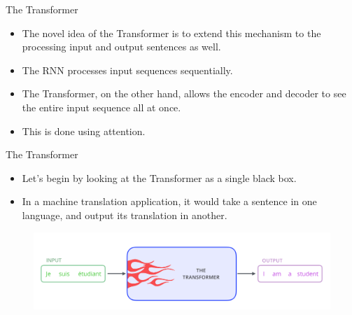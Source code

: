 \documentclass[handout]{beamer}
\begin{document}
\begin{frame}{The Transformer}
\begin{scriptsize}
\begin{itemize}
 \item The novel idea of the Transformer is to extend this mechanism to the processing input and output sentences as well.
 \item The RNN processes input sequences sequentially. 
 \item The Transformer, on the other hand, allows the encoder and decoder to see the entire input sequence all at once.
 \item This is done using attention.
\end{itemize}



\end{scriptsize}

\end{frame}



\begin{frame}{The Transformer}
\begin{scriptsize}
 \begin{itemize}
  \item Let’s begin by looking at the Transformer as a single black box. 
  \item In a machine translation application, it would take a sentence in one language, and output its translation in another.
 \end{itemize}

\end{scriptsize}



     \begin{figure}[h]
        	\includegraphics[scale = 0.29]{pics/the_transformer_3.png}
        \end{figure}  


\end{frame}
\end{document}
